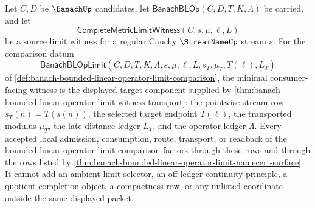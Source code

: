 \begin{lemma}
\label{lem:banach-bounded-linear-operator-limit-comparison-minimal-witness}
Let $C,D$ be $\BanachUp$ candidates, let
$\mathsf{BanachBLOp}(C,D,T,K,\Lambda)$ be carried, and let
$$
\mathsf{CompleteMetricLimitWitness}(C,s,\mu,\ell,L)
$$
be a source limit witness for a regular Cauchy $\StreamNameUp$ stream $s$.
For the comparison datum
$$
\mathsf{BanachBLOpLimit}(C,D,T,K,\Lambda,s,\mu,\ell,L,s_T,\mu_T,T(\ell),L_T)
$$
of \autoref{def:banach-bounded-linear-operator-limit-comparison}, the
minimal consumer-facing witness is the displayed target component supplied by
\autoref{thm:banach-bounded-linear-operator-limit-witness-transport}: the
pointwise stream row $s_T(n)=T(s(n))$, the selected target endpoint $T(\ell)$,
the transported modulus $\mu_T$, the late-distance ledger $L_T$, and the
operator ledger $\Lambda$. Every accepted local admission, consumption,
route, transport, or readback of the bounded-linear-operator limit comparison
factors through these rows and through the rows listed by
\autoref{thm:banach-bounded-linear-operator-limit-namecert-surface}. It cannot
add an ambient limit selector, an off-ledger continuity principle, a quotient
completion object, a compactness row, or any unlisted coordinate outside the
same displayed packet.
\end{lemma}
